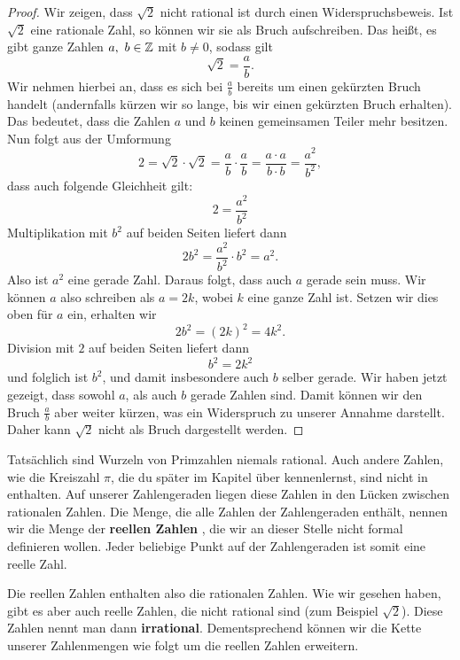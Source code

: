 \documentclass[../../main.tex]{subfiles}
\begin{document}
	\begin{proof}
		Wir zeigen, dass $\sqrt{2}$ nicht rational ist durch einen Widerspruchsbeweis. Ist $\sqrt{2}$ eine rationale Zahl, so können wir sie als Bruch aufschreiben. Das heißt, es gibt ganze Zahlen $a, \ b\in\Integer$ mit $b \neq 0$, sodass gilt
		\[\sqrt{2} = \frac{a}{b}.\]
		Wir nehmen hierbei an, dass es sich bei $\frac{a}{b}$ bereits um einen gekürzten Bruch handelt (andernfalls kürzen wir so lange, bis wir einen gekürzten Bruch erhalten). Das bedeutet, dass die Zahlen $a$ und $b$ keinen gemeinsamen Teiler mehr besitzen. Nun folgt aus der Umformung
		\[2 = \sqrt{2}\cdot\sqrt{2} = \frac{a}{b}\cdot\frac{a}{b} =\frac{a\cdot a}{b\cdot b}= \frac{a^2}{b^2},\]
		dass auch folgende Gleichheit gilt:
		\[2 = \frac{a^2}{b^2}\]
		Multiplikation mit $b^2$ auf beiden Seiten liefert dann
		\[2b^2 = \frac{a^2}{b^2}\cdot b^2 = a^2.\]
		Also ist $a^2$ eine gerade Zahl. Daraus folgt, dass auch $a$ gerade sein muss. Wir können $a$ also schreiben als 
		$a = 2k$, wobei $k$ eine ganze Zahl ist. Setzen wir dies oben für $a$ ein, erhalten wir
		\[2b^2 = \left(2k\right)^2 = 4k^2.\]
		Division mit $2$ auf beiden Seiten liefert dann
		\[b^2 = 2k^2\]
		und folglich ist $b^2$, und damit insbesondere auch $b$ selber gerade. Wir haben jetzt gezeigt, dass sowohl $a$, als auch $b$ gerade Zahlen sind. Damit können wir den Bruch $\frac{a}{b}$ aber weiter kürzen, was ein Widerspruch zu unserer Annahme darstellt. Daher kann $\sqrt{2}$ nicht als Bruch dargestellt werden.
	\end{proof}

	Tatsächlich sind Wurzeln von Primzahlen niemals rational. Auch andere Zahlen, wie die Kreiszahl $\pi$, die du später im Kapitel über  kennenlernst, sind nicht in \Rational enthalten. Auf unserer Zahlengeraden liegen diese Zahlen in den Lücken zwischen rationalen Zahlen. Die Menge, die alle Zahlen der Zahlengeraden enthält, nennen wir die Menge der \textbf{reellen Zahlen} \Real, die wir an dieser Stelle nicht formal definieren wollen. Jeder beliebige Punkt auf der Zahlengeraden ist somit eine reelle Zahl.
	
	Die reellen Zahlen enthalten also die rationalen Zahlen. Wie wir gesehen haben, gibt es aber auch reelle Zahlen, die nicht rational sind (zum Beispiel $\sqrt{2}$). Diese Zahlen nennt man dann \textbf{irrational}. Dementsprechend können wir die Kette unserer Zahlenmengen wie folgt um die reellen Zahlen erweitern. 
	
\end{document}
